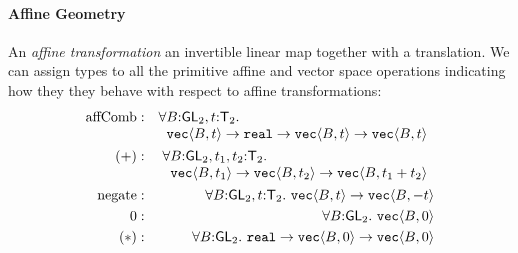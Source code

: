 \paragraph{Affine Geometry} An \emph{affine transformation} 
an invertible linear map together with a translation. We can assign
types to all the primitive affine and vector space operations
indicating how they they behave with respect to affine
transformations:
\begin{eqnarray*}
  \mathrm{affComb} & : &
  \begin{array}[t]{@{}l}
    \forall B \mathord: \SynGL{2}, t \mathord: \SynTransl{2}.\\
    \hspace{0.2cm} \tyPrim{vec}{B,t} \to \tyPrimNm{real} \to
    \tyPrim{vec}{B,t} \to \tyPrim{vec}{B,t}
  \end{array}
  \\
  (+) & : &
  \begin{array}[t]{@{}l}
    \forall B \mathord: \SynGL{2}, t_1,t_2 \mathord: \SynTransl{2}. \\
    \hspace{0.2cm}\tyPrim{vec}{B,t_1} \to \tyPrim{vec}{B,t_2} \to
    \tyPrim{vec}{B,t_1 + t_2}
  \end{array}
  \\
  \mathrm{negate} & : & \forall B \mathord: \SynGL{2}, t \mathord: \SynTransl{2}.\ \tyPrim{vec}{B,t} \to \tyPrim{vec}{B,-t} \\
  0 & : & \forall B \mathord: \SynGL{2}.\ \tyPrim{vec}{B,0} \\
  (*) & : & \forall B \mathord: \SynGL{2}.\ \tyPrimNm{real} \to \tyPrim{vec}{B,0} \to \tyPrim{vec}{B,0}
\end{eqnarray*}


